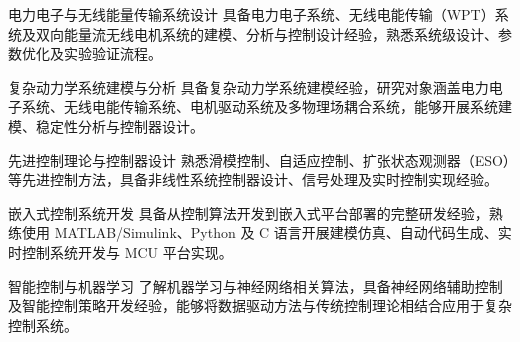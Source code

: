 
\vspace{1em}
\begin{cvexpertises}

  \begin{cvexpertise}{电力电子与无线能量传输系统设计}
  具备电力电子系统、无线电能传输（WPT）系统及双向能量流无线电机系统的建模、分析与控制设计经验，熟悉系统级设计、参数优化及实验验证流程。
  \end{cvexpertise}

  \begin{cvexpertise}{复杂动力学系统建模与分析}
  具备复杂动力学系统建模经验，研究对象涵盖电力电子系统、无线电能传输系统、电机驱动系统及多物理场耦合系统，能够开展系统建模、稳定性分析与控制器设计。
  \end{cvexpertise}

  \begin{cvexpertise}{先进控制理论与控制器设计}
  熟悉滑模控制、自适应控制、扩张状态观测器（ESO）等先进控制方法，具备非线性系统控制器设计、信号处理及实时控制实现经验。
  \end{cvexpertise}

  \begin{cvexpertise}{嵌入式控制系统开发}
  具备从控制算法开发到嵌入式平台部署的完整研发经验，熟练使用 MATLAB/Simulink、Python 及 C 语言开展建模仿真、自动代码生成、实时控制系统开发与 MCU 平台实现。
  \end{cvexpertise}

  \begin{cvexpertise}{智能控制与机器学习}
  了解机器学习与神经网络相关算法，具备神经网络辅助控制及智能控制策略开发经验，能够将数据驱动方法与传统控制理论相结合应用于复杂控制系统。
  \end{cvexpertise}

\end{cvexpertises}
